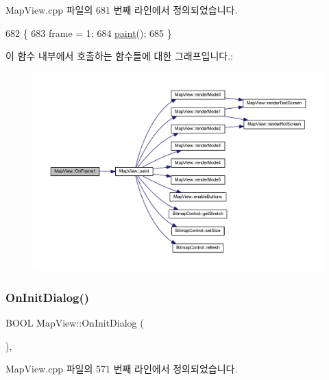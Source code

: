 Map\+View.\+cpp 파일의 681 번째 라인에서 정의되었습니다.


\begin{DoxyCode}
682 \{
683   frame = 1;
684   \mbox{\hyperlink{class_map_view_a89edf3053cffa4a68516178dbd987339}{paint}}();
685 \}
\end{DoxyCode}
이 함수 내부에서 호출하는 함수들에 대한 그래프입니다.\+:
\nopagebreak
\begin{figure}[H]
\begin{center}
\leavevmode
\includegraphics[width=350pt]{class_map_view_ad8ca5cae3a97cb68c733a993317ce695_cgraph}
\end{center}
\end{figure}
\mbox{\label{class_map_view_a10c4f05b5c4289dfc08c6501de3cf40c}} 
\subsubsection{\texorpdfstring{On\+Init\+Dialog()}{OnInitDialog()}}
{\footnotesize\ttfamily B\+O\+OL Map\+View\+::\+On\+Init\+Dialog (\begin{DoxyParamCaption}{ }\end{DoxyParamCaption})\hspace{0.3cm}{\ttfamily [protected]}, {\ttfamily [virtual]}}



Map\+View.\+cpp 파일의 571 번째 라인에서 정의되었습니다.


